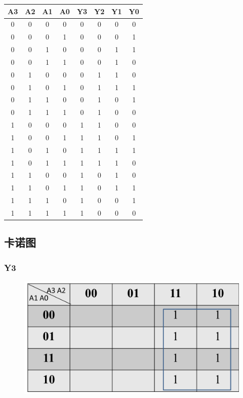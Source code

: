 \documentclass{article}
\begin{document}
\begin{table}[!hbp]
\begin{tabular}{|c|c|c|c||c|c|c|c|}
\hline
A3 & A2 & A1 & A0 & Y3 & Y2 & Y1 & Y0 \\
\hline
\hline
0 & 0 & 0 & 0 & 0 & 0 & 0 & 0 \\
\hline
0 & 0 & 0 & 1 & 0 & 0 & 0 & 1 \\
\hline
0 & 0 & 1 & 0 & 0 & 0 & 1 & 1 \\
\hline
0 & 0 & 1 & 1 & 0 & 0 & 1 & 0 \\
\hline
0 & 1 & 0 & 0 & 0 & 1 & 1 & 0 \\
\hline
0 & 1 & 0 & 1 & 0 & 1 & 1 & 1 \\
\hline
0 & 1 & 1 & 0 & 0 & 1 & 0 & 1 \\
\hline
0 & 1 & 1 & 1 & 0 & 1 & 0 & 0 \\
\hline
1 & 0 & 0 & 0 & 1 & 1 & 0 & 0 \\
\hline
1 & 0 & 0 & 1 & 1 & 1 & 0 & 1 \\
\hline
1 & 0 & 1 & 0 & 1 & 1 & 1 & 1 \\
\hline
1 & 0 & 1 & 1 & 1 & 1 & 1 & 0 \\
\hline
1 & 1 & 0 & 0 & 1 & 0 & 1 & 0 \\
\hline
1 & 1 & 0 & 1 & 1 & 0 & 1 & 1 \\
\hline
1 & 1 & 1 & 0 & 1 & 0 & 0 & 1 \\
\hline
1 & 1 & 1 & 1 & 1 & 0 & 0 & 0 \\
\hline

\end{tabular}
\end{table}

\subsection{卡诺图}

\subsubsection{Y3}

\begin{figure}[!hbp]
  \centering
  \includegraphics[scale=0.45]{S4.png}
\end{figure}
\end{document}
